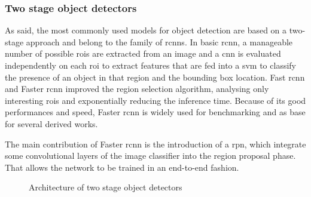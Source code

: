 \documentclass[%
    corpo=12pt,
    twoside,
    stile=classica,   
    tipotesi=magistrale,
    evenboxes,
    english
]{toptesi}
\begin{document}
\subsubsection{Two stage object detectors}
As said, the most commonly used models for object detection are based on a two-stage approach and belong to the family of \glspl{rcnn}. In basic \acrshort{rcnn}\cite{girshick2014rich}, a manageable number of possible \glspl{roi} are extracted from an image and a \gls{cnn} is evaluated independently on each \acrshort{roi} to extract features that are fed into a \gls{svm} to classify the presence of an object in that region and the bounding box location. Fast \acrshort{rcnn}\cite{girshick2015fast} and Faster \acrshort{rcnn}\cite{ren2016faster} improved the region selection algorithm, analysing only interesting \glspl{roi} and exponentially reducing the inference time. Because of its good performances and speed, Faster \acrshort{rcnn} is widely used for benchmarking and as base for several derived works.


The main contribution of Faster \acrshort{rcnn} is the introduction of a \gls{rpn}, which integrate some convolutional layers of the image classifier into the region proposal phase. That allows the network to be trained in an end-to-end fashion.

\begin{figure}[ht]
	\centering
	\caption{Architecture of two stage object detectors}
	\label{fig:architectures}
\end{figure}
\end{document}
